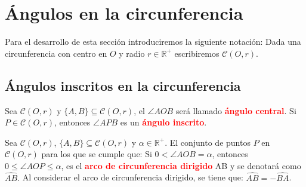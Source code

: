 \section{Ángulos en la circunferencia}
Para el desarrollo de esta sección introduciremos la siguiente notación: Dada una circunferencia con centro en $O$ y radio $r\in\mathbb{R^{+}}$ escribiremos $\mathcal{C}(O,r)$.

\subsection{Ángulos inscritos en la circunferencia}
\begin{df}
Sea $\mathcal{C}(O, r)$ y $\{A,B\}\subseteq\mathcal{C}(O,r)$, el $\angle AOB$ será llamado \textcolor{red}{\bf ángulo central}. Si $P\in\mathcal{C}(O,r)$, entonces $\angle APB$ es un \textcolor{red}{\bf ángulo inscrito}. 
\end{df}

\begin{df}
Sea $\mathcal{C}(O,r)$, $\{A,B\}\subseteq\mathcal{C}(O,r)$ y $\alpha\in\mathbb{R}^{+}$. El conjunto de puntos $P$ en $\mathcal{C}(O,r)$ para los que se cumple que: Si $0<\angle AOB=\alpha$, entonces $0\leq\angle AOP\leq\alpha$, es el \textcolor{red}{\bf arco de circunferencia dirigido} AB y se denotará como $\widehat{AB}.$
Al considerar el arco de circunferencia dirigido, se tiene que: $\widehat{AB}=-\widehat{BA}$.
\end{df}


